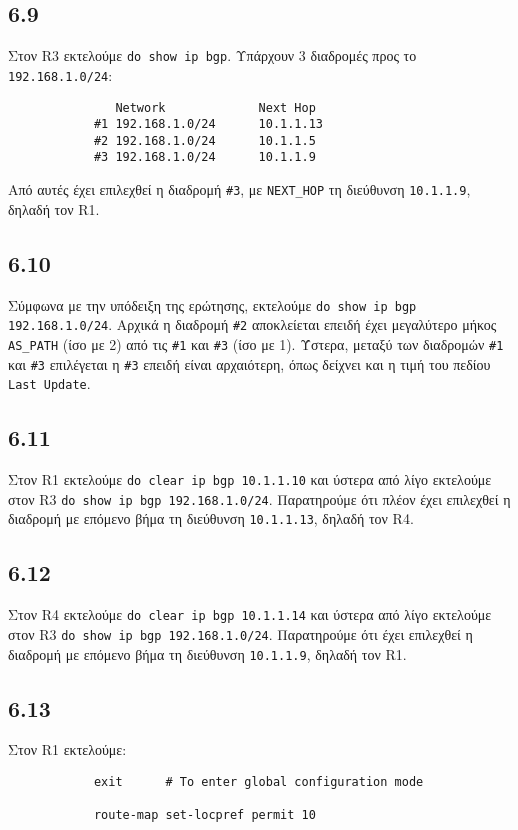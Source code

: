 \documentclass[a4paper, 12pt]{article}
\begin{document}
	\subsection*{6.9}
		Στον R3 εκτελούμε \verb|do show ip bgp|. Υπάρχουν 3 διαδρομές προς το \verb|192.168.1.0/24|:
		
		\begin{verbatim}
			   Network             Next Hop
			#1 192.168.1.0/24      10.1.1.13
			#2 192.168.1.0/24      10.1.1.5
			#3 192.168.1.0/24      10.1.1.9
		\end{verbatim}
		
		Από αυτές έχει επιλεχθεί η διαδρομή \verb|#3|, με \verb|NEXT_HOP| τη διεύθυνση \verb|10.1.1.9|, δηλαδή τον R1.

	\subsection*{6.10}
		Σύμφωνα με την υπόδειξη της ερώτησης, εκτελούμε \verb|do show ip bgp 192.168.1.0/24|. Αρχικά η διαδρομή \verb|#2| αποκλείεται επειδή έχει μεγαλύτερο μήκος \verb|AS_PATH| (ίσο με 2) από τις \verb|#1| και \verb|#3| (ίσο με 1). Ύστερα, μεταξύ των διαδρομών \verb|#1| και \verb|#3| επιλέγεται η \verb|#3| επειδή είναι αρχαιότερη, όπως δείχνει και η τιμή του πεδίου \verb|Last Update|. 

	\subsection*{6.11}
		Στον R1 εκτελούμε \verb|do clear ip bgp 10.1.1.10| και ύστερα από λίγο εκτελούμε στον R3 \verb|do show ip bgp 192.168.1.0/24|. Παρατηρούμε ότι πλέον έχει επιλεχθεί η διαδρομή με επόμενο βήμα τη διεύθυνση \verb|10.1.1.13|, δηλαδή τον R4.

	\subsection*{6.12}
		Στον R4 εκτελούμε \verb|do clear ip bgp 10.1.1.14| και ύστερα από λίγο εκτελούμε στον R3 \verb|do show ip bgp 192.168.1.0/24|. Παρατηρούμε ότι έχει επιλεχθεί η διαδρομή με επόμενο βήμα τη διεύθυνση \verb|10.1.1.9|, δηλαδή τον R1.

	\subsection*{6.13}
		Στον R1 εκτελούμε:
		
		\begin{verbatim}
			exit      # To enter global configuration mode
			
			route-map set-locpref permit 10
		\end{verbatim}
\end{document}
